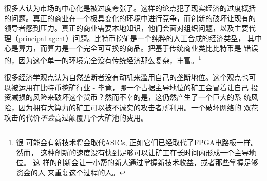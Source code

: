 \documentclass[letterpaper]{article}
\begin{document}
很多人认为市场的中心化是被过度夸张了。这样的论点犯了现实经济的过度概括
的问题。真正的商业在一个极具变化的环境中进行竞争，而创新的破坏让现有的
领导者感到压力。真正的商业需要本地知识，他们会面对组织问题，以及主要代
理（principal agent）问题。比特币挖矿是一个纯粹的人工合成的经济类型，
其中心是算力，而算力是一个完全可互换的商品。把基于传统商业类比比特币是
错误的，因为这个单一的环境完全没有传统经济那么复杂，丰富。\footnote{很
  可能会有新技术将会取代ASICs, 正如它们已经取代了FPGA电路板一样。然而，
  这种创新的速度没有快到足够可以让矿工在长时间内形成一个主导地位。 这
  样的创新会让一小帮的新人通过掌握新技术收益，或者那些掌握足够资金的人
  来重复这个过程的人。}


很多经济学观点认为自然垄断者没有动机来滥用自己的垄断地位。这个观点也可
以被运用在比特币挖矿行业 - 毕竟，哪一个占据主导地位的矿工会冒着让自己
投资减损的风险来破坏这个货币？然而不幸的是，这仍然产生了一个巨大的系
统风险，因为拥有大算力的矿工可以被不诚实的攻击者所利用。一个破坏网络的
双花攻击的代价\emph{不会}高过颠覆几个大矿池的费用。
\end{document}
